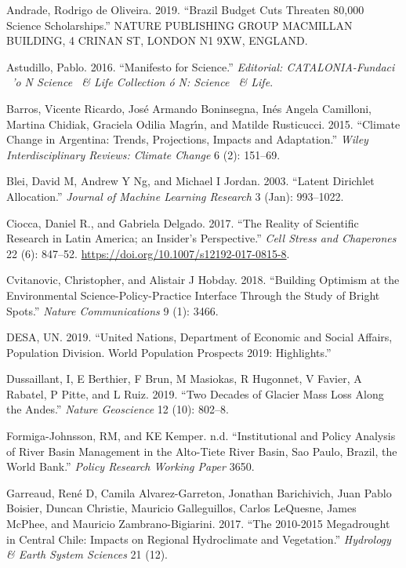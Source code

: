 \documentclass[]{article}
\begin{document}
\leavevmode\hypertarget{ref-Andrade2019}{}%
Andrade, Rodrigo de Oliveira. 2019. ``Brazil Budget Cuts Threaten 80,000
Science Scholarships.'' NATURE PUBLISHING GROUP MACMILLAN BUILDING, 4
CRINAN ST, LONDON N1 9XW, ENGLAND.

\leavevmode\hypertarget{ref-Astudillo2016}{}%
Astudillo, Pablo. 2016. ``Manifesto for Science.'' \emph{Editorial:
CATALONIA-Fundaci ~'o N Science ~\& Life Collection ó N: Science ~\&
Life}.

\leavevmode\hypertarget{ref-Barros2015}{}%
Barros, Vicente Ricardo, José Armando Boninsegna, Inés Angela Camilloni,
Martina Chidiak, Graciela Odilia Magrı́n, and Matilde Rusticucci. 2015.
``Climate Change in Argentina: Trends, Projections, Impacts and
Adaptation.'' \emph{Wiley Interdisciplinary Reviews: Climate Change} 6
(2): 151--69.

\leavevmode\hypertarget{ref-Blei2003}{}%
Blei, David M, Andrew Y Ng, and Michael I Jordan. 2003. ``Latent
Dirichlet Allocation.'' \emph{Journal of Machine Learning Research} 3
(Jan): 993--1022.

\leavevmode\hypertarget{ref-Ciocca2017}{}%
Ciocca, Daniel R., and Gabriela Delgado. 2017. ``The Reality of
Scientific Research in Latin America; an Insider's Perspective.''
\emph{Cell Stress and Chaperones} 22 (6): 847--52.
\url{https://doi.org/10.1007/s12192-017-0815-8}.

\leavevmode\hypertarget{ref-Cvitanovic2018}{}%
Cvitanovic, Christopher, and Alistair J Hobday. 2018. ``Building
Optimism at the Environmental Science-Policy-Practice Interface Through
the Study of Bright Spots.'' \emph{Nature Communications} 9 (1): 3466.

\leavevmode\hypertarget{ref-desa2019united}{}%
DESA, UN. 2019. ``United Nations, Department of Economic and Social
Affairs, Population Division. World Population Prospects 2019:
Highlights.''

\leavevmode\hypertarget{ref-Dussaillant2019}{}%
Dussaillant, I, E Berthier, F Brun, M Masiokas, R Hugonnet, V Favier, A
Rabatel, P Pitte, and L Ruiz. 2019. ``Two Decades of Glacier Mass Loss
Along the Andes.'' \emph{Nature Geoscience} 12 (10): 802--8.

\leavevmode\hypertarget{ref-Formiga2005}{}%
Formiga-Johnsson, RM, and KE Kemper. n.d. ``Institutional and Policy
Analysis of River Basin Management in the Alto-Tiete River Basin, Sao
Paulo, Brazil, the World Bank.'' \emph{Policy Research Working Paper}
3650.

\leavevmode\hypertarget{ref-Garreaud2017}{}%
Garreaud, René D, Camila Alvarez-Garreton, Jonathan Barichivich, Juan
Pablo Boisier, Duncan Christie, Mauricio Galleguillos, Carlos LeQuesne,
James McPhee, and Mauricio Zambrano-Bigiarini. 2017. ``The 2010-2015
Megadrought in Central Chile: Impacts on Regional Hydroclimate and
Vegetation.'' \emph{Hydrology \& Earth System Sciences} 21 (12).
\end{document}
